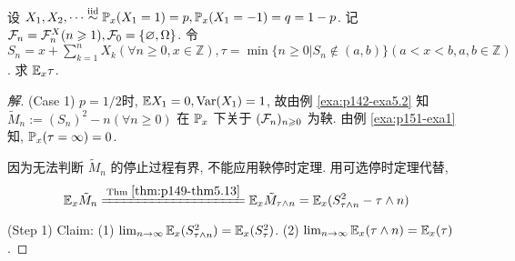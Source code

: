 \begin{example}[赌博的持续时间]\label{exa:p155-exa3}
    设 $X_1,X_2,\cdots \overset{\text{iid}}{\sim} \mathbb{P}_x(X_1=1)=p, \mathbb{P}_x(X_1=-1)=q=1-p$. 记 $\mathcal{F}_n=\mathcal{F}_n^X(n\geqslant 1),\mathcal{F}_0=\{\varnothing,\Omega\}$. 令 $S_n=x+\sum_{k=1}^n X_k (\forall n\geq 0, x\in \mathbb{Z}), \tau=\min\{n\geq 0|S_n\notin (a,b)\}(a<x<b,a,b\in\mathbb{Z})$. 求 $\mathbb E_x \tau$.
\end{example}

\begin{proof}[解]
(Case 1) $p=1/2$时, $\mathbb E X_1=0, \operatorname{Var}(X_1)=1$, 故由例 \ref{exa:p142-exa5.2} 知 $\tilde{M}_n:=(S_n)^2-n(\forall n\geq 0)$ 在 $\mathbb{P}_x$ 下关于 $(\mathcal{F}_n)_{n\geqslant 0}$ 为鞅. 由例 \ref{exa:p151-exa1} 知, $\mathbb{P}_x(\tau=\infty)=0$.

因为无法判断 $\tilde{M}_n$ 的停止过程有界, 不能应用鞅停时定理. 用可选停时定理代替,
\[
\EE_x \tilde{M}_n\xlongequal{\text{Thm }\ref{thm:p149-thm5.13}}\EE_x \tilde{M}_{\tau\land n}=\EE_x(S_{\tau\land n}^2-\tau\land n)
\]

(Step 1) Claim: (1) $\lim_{n \to \infty}\mathbb E_x(S_{\tau\land n}^2)=\mathbb E_x(S_{\tau}^2)$. (2) $\lim_{n \to \infty}\mathbb E_x (\tau\land n)=\mathbb E_x(\tau)$.


\end{proof}
